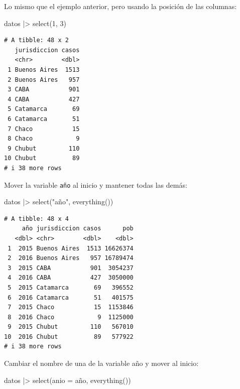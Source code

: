 \documentclass[
  spanish,
  a4paper,
]{scrbook}
\newenvironment{Shaded}{\begin{snugshade}}{\end{snugshade}}
\newcommand{\AttributeTok}[1]{\textcolor[rgb]{0.40,0.45,0.13}{#1}}
\newcommand{\DecValTok}[1]{\textcolor[rgb]{0.68,0.00,0.00}{#1}}
\newcommand{\FunctionTok}[1]{\textcolor[rgb]{0.28,0.35,0.67}{#1}}
\newcommand{\NormalTok}[1]{\textcolor[rgb]{0.00,0.23,0.31}{#1}}
\newcommand{\SpecialCharTok}[1]{\textcolor[rgb]{0.37,0.37,0.37}{#1}}
\newcommand{\StringTok}[1]{\textcolor[rgb]{0.13,0.47,0.30}{#1}}
\begin{document}
Lo mismo que el ejemplo anterior, pero usando la posición de las
columnas:

\begin{Shaded}
\begin{Highlighting}[]
\NormalTok{datos }\SpecialCharTok{|\textgreater{}}
  \FunctionTok{select}\NormalTok{(}\DecValTok{1}\NormalTok{, }\DecValTok{3}\NormalTok{)}
\end{Highlighting}
\end{Shaded}

\begin{verbatim}
# A tibble: 48 x 2
   jurisdiccion casos
   <chr>        <dbl>
 1 Buenos Aires  1513
 2 Buenos Aires   957
 3 CABA           901
 4 CABA           427
 5 Catamarca       69
 6 Catamarca       51
 7 Chaco           15
 8 Chaco            9
 9 Chubut         110
10 Chubut          89
# i 38 more rows
\end{verbatim}

Mover la variable \texttt{año} al inicio y mantener todas las demás:

\begin{Shaded}
\begin{Highlighting}[]
\NormalTok{datos }\SpecialCharTok{|\textgreater{}}
  \FunctionTok{select}\NormalTok{(}\StringTok{"año"}\NormalTok{, }\FunctionTok{everything}\NormalTok{())}
\end{Highlighting}
\end{Shaded}

\begin{verbatim}
# A tibble: 48 x 4
     año jurisdiccion casos      pob
   <dbl> <chr>        <dbl>    <dbl>
 1  2015 Buenos Aires  1513 16626374
 2  2016 Buenos Aires   957 16789474
 3  2015 CABA           901  3054237
 4  2016 CABA           427  3050000
 5  2015 Catamarca       69   396552
 6  2016 Catamarca       51   401575
 7  2015 Chaco           15  1153846
 8  2016 Chaco            9  1125000
 9  2015 Chubut         110   567010
10  2016 Chubut          89   577922
# i 38 more rows
\end{verbatim}

Cambiar el nombre de una de la variable año y mover al inicio:

\begin{Shaded}
\begin{Highlighting}[]
\NormalTok{datos }\SpecialCharTok{|\textgreater{}}
  \FunctionTok{select}\NormalTok{(}\AttributeTok{anio =}\NormalTok{ año, }\FunctionTok{everything}\NormalTok{())}
\end{Highlighting}
\end{Shaded}
\end{document}
